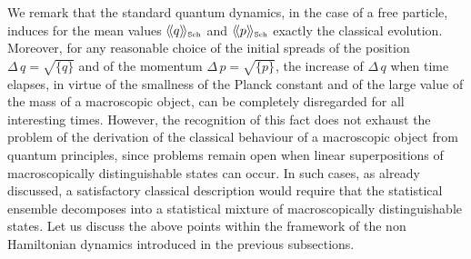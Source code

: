 \documentclass[12pt]{article}
\newcommand{\llangle}{\langle\!\langle}
\newcommand{\rrangle}{\rangle\!\rangle}
\begin{document}
We remark that the standard quantum dynamics, in the case of a
free particle, induces for the mean values $\llangle q
\rrangle_{\makebox{\tiny Sch}}$ and $\llangle p
\rrangle_{\makebox{\tiny Sch}}$ exactly the classical evolution.
Moreover, for any reasonable choice of the initial spreads of the
position $\Delta\, q = \sqrt{\{ q\}}$ and of the momentum
$\Delta\, p = \sqrt{\{ p\}}$, the increase of $\Delta\, q$ when
time elapses, in virtue of the smallness of the Planck constant
and of the large value of the mass of a macroscopic object, can be
completely disregarded  for all interesting times. However, the
recognition of this fact does not exhaust the problem of the
derivation of the classical behaviour of a macroscopic object from
quantum principles, since problems remain open when linear
superpositions of macroscopically distinguishable states can
occur. In such cases, as already discussed, a satisfactory
classical description would require that the statistical ensemble
decomposes into a statistical mixture of macroscopically
distinguishable states. Let us discuss the above points within the
framework of the non Hamiltonian dynamics introduced in the
previous subsections.
\end{document}
